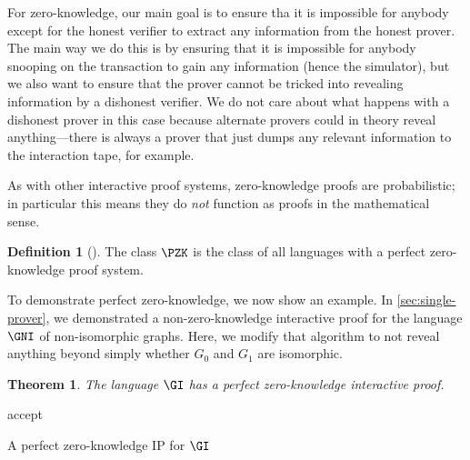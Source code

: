 \documentclass[english,12pt]{reedthesis}
\theoremstyle{plain}
\newtheorem{thm}{Theorem}[section]
\theoremstyle{definition}
\newtheorem{defn}[defn]{Definition}
\theoremstyle{remark}
\begin{document}
For zero-knowledge, our main goal is to ensure tha it is impossible for anybody
except for the honest verifier to extract any information from the honest
prover. The main way we do this is by ensuring that it is impossible for anybody
snooping on the transaction to gain any information (hence the simulator), but
we also want to ensure that the prover cannot be tricked into revealing
information by a dishonest verifier. We do not care about what happens with a
dishonest prover in this case because alternate provers could in theory reveal
anything---there is always a prover that just dumps any relevant information to
the interaction tape, for example.

As with other interactive proof systems, zero-knowledge proofs are
probabilistic; in particular this means they do \emph{not} function as proofs in
the mathematical sense.

\begin{defn}[{\cite[Def.\ 4.3.5]{Go01}}]\label{def:pzk}
  The class $\PZK$ is the class of all languages with a perfect zero-knowledge
  proof system.
\end{defn}

To demonstrate perfect zero-knowledge, we now show an example. In
\cref{sec:single-prover}, we demonstrated a non-zero-knowledge interactive proof
for the language $\GNI$ of non-isomorphic graphs. Here, we modify that algorithm
to not reveal anything beyond simply whether $G_{0}$ and $G_{1}$ are isomorphic.

\begin{thm}\label{thm:gi-pzk-ip}
  The language $\GI$ has a perfect zero-knowledge interactive proof.
\end{thm}

\begin{algorithm}[htbp]
  accept\;
  \caption{A perfect zero-knowledge IP for $\GI$}\label{alg:gi-pzk-ip}
\end{algorithm}
\end{document}
